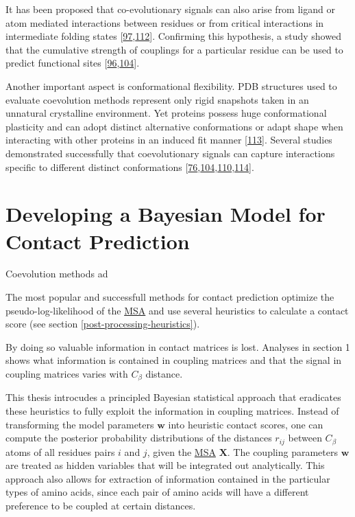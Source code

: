 \documentclass[12pt,a4paper,twoside]{book}
\newcommand{\Cb}{C_\beta}
\newcommand{\w}{\mathbf{w}}
\newcommand{\X}{\mathbf{X}}
\theoremstyle{definition}
\theoremstyle{definition}
\theoremstyle{remark}
\begin{document}
It has been proposed that co-evolutionary signals can also arise from
ligand or atom mediated interactions between residues or from critical
interactions in intermediate folding states
{[}\protect\hyperlink{ref-Buslje2009}{97},\protect\hyperlink{ref-Ovchinnikov2015b}{112}{]}.
Confirming this hypothesis, a study showed that the cumulative strength
of couplings for a particular residue can be used to predict functional
sites
{[}\protect\hyperlink{ref-Marks2012}{96},\protect\hyperlink{ref-Hopf2012}{104}{]}.

Another important aspect is conformational flexibility. PDB structures
used to evaluate coevolution methods represent only rigid snapshots
taken in an unnatural crystalline environment. Yet proteins possess huge
conformational plasticity and can adopt distinct alternative
conformations or adapt shape when interacting with other proteins in an
induced fit manner {[}\protect\hyperlink{ref-Noel2016}{113}{]}. Several
studies demonstrated successfully that coevolutionary signals can
capture interactions specific to different distinct conformations
{[}\protect\hyperlink{ref-Morcos2011}{76},\protect\hyperlink{ref-Hopf2012}{104},\protect\hyperlink{ref-Jana2014}{110},\protect\hyperlink{ref-Sfriso2016}{114}{]}.

\section{Developing a Bayesian Model for Contact
Prediction}\label{developing-a-bayesian-model-for-contact-prediction}

Coevolution methods ad

The most popular and successfull methods for contact prediction optimize
the pseudo-log-likelihood of the \protect\hyperlink{abbrev}{MSA} and use
several heuristics to calculate a contact score (see section
\ref{post-processing-heuristics}).

By doing so valuable information in contact matrices is lost. Analyses
in section 1 shows what information is contained in coupling matrices
and that the signal in coupling matrices varies with \(\Cb\) distance.

This thesis introcudes a principled Bayesian statistical approach that
eradicates these heuristics to fully exploit the information in coupling
matrices. Instead of transforming the model parameters \(\w\) into
heuristic contact scores, one can compute the posterior probability
distributions of the distances \(r_{ij}\) between \(\Cb\) atoms of all
residues pairs \(i\) and \(j\), given the
\protect\hyperlink{abbrev}{MSA} \(\X\). The coupling parameters \(\w\)
are treated as hidden variables that will be integrated out
analytically. This approach also allows for extraction of information
contained in the particular types of amino acids, since each pair of
amino acids will have a different preference to be coupled at certain
distances.
\end{document}
